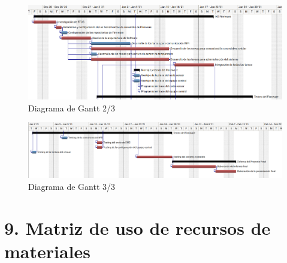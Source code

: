 \documentclass[11pt]{charter}
\begin{document}
\vspace{10px}

\begin{figure}[H]
\centering 
\includegraphics[width=.7\textwidth]{./Figuras/gant2.png}
\caption{Diagrama de Gantt 2/3}
\label{fig:diagGantt}
\end{figure}

\vspace{10px}


\begin{figure}[H]
\centering 
\includegraphics[width=.7\textwidth]{./Figuras/gant3.png}
\caption{Diagrama de Gantt 3/3}
\label{fig:diagGantt}
\end{figure}

\vspace{10px}


\section{9. Matriz de uso de recursos de materiales}
\label{sec:recursos}
\end{document}
